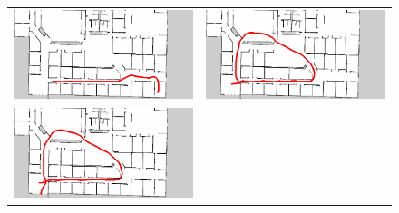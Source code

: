 \begin{figure}[h]
  \begin{tabular}{cc}
    \begin{minipage}[h]{0.45\hsize}
      \centering
      \includegraphics[keepaspectratio, scale=0.3]{images/exp1.2_8000_1.png}
    \end{minipage} &
    \begin{minipage}[h]{0.45\hsize}
      \centering
      \includegraphics[keepaspectratio, scale=0.3]{images/exp1.2_8000_3.png}
    \end{minipage} \\
    \begin{minipage}[h]{0.45\hsize}
      \centering
      \includegraphics[keepaspectratio, scale=0.3]{images/exp1.2_8000_4.png}

\end{minipage}
\end{tabular}
\end{figure}

